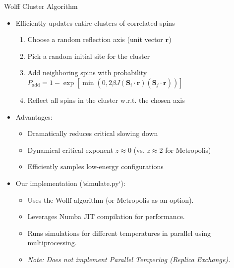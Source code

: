 \documentclass[11pt,aspectratio=169]{beamer}
\begin{document}
\begin{frame}{Wolff Cluster Algorithm}
    \begin{itemize}
        \item Efficiently updates entire clusters of correlated spins
        \begin{enumerate}
            \item Choose a random reflection axis (unit vector $\mathbf{r}$)
            \item Pick a random initial site for the cluster
            \item Add neighboring spins with probability $P_{\text{add}} = 1 - \exp[\min(0, 2\beta J (\mathbf{S}_i \cdot \mathbf{r})(\mathbf{S}_j \cdot \mathbf{r}))]$
            \item Reflect all spins in the cluster w.r.t. the chosen axis
        \end{enumerate}
        \pause
        \item Advantages:
        \begin{itemize}
            \item Dramatically reduces critical slowing down
            \item Dynamical critical exponent $z \approx 0$ (vs. $z \approx 2$ for Metropolis)
            \item Efficiently samples low-energy configurations
        \end{itemize}
        \pause
        \item Our implementation (`simulate.py`):
        \begin{itemize}
            \item Uses the Wolff algorithm (or Metropolis as an option).
            \item Leverages Numba JIT compilation for performance.
            \item Runs simulations for different temperatures in parallel using multiprocessing.
            \item \textit{Note: Does not implement Parallel Tempering (Replica Exchange).}
        \end{itemize}
    \end{itemize}
\end{frame}
\end{document}
